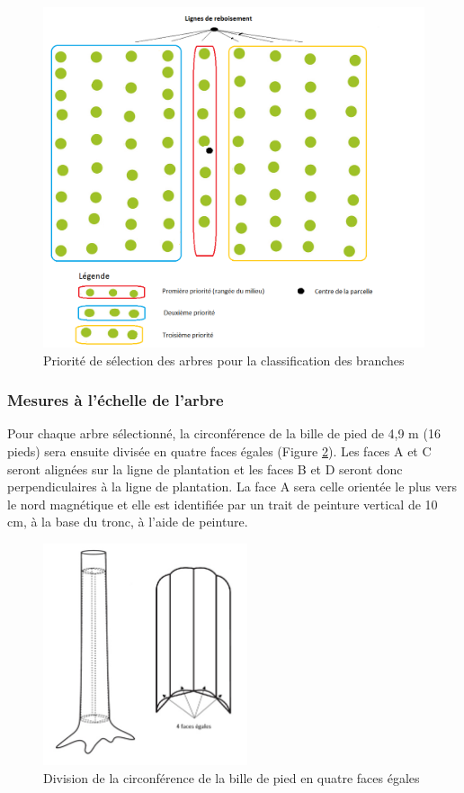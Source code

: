 \documentclass[letterpaper, 12pt]{article}
\begin{document}
\begin{onehalfspace}
\begin{figure} [H]
	\centering
	\includegraphics[width=14cm]{Figure1}
	\caption{Priorité de sélection des arbres pour la classification des branches}
	\label{select}
\end{figure}

\vspace{12pt}

\subsubsection{Mesures à l'échelle de l'arbre}

Pour chaque arbre sélectionné, la circonférence de la bille de pied de 4,9 m (16 pieds) sera ensuite divisée en quatre faces égales (Figure \ref{face}). Les faces A et C seront alignées sur la ligne de plantation et les faces B et D seront donc perpendiculaires à la ligne de plantation. La face A sera celle orientée le plus vers le nord magnétique et elle est identifiée par un trait de peinture vertical de 10 cm, à la base du tronc, à l’aide de peinture.

\vspace{12pt}

\begin{figure}[H]
	\centering
	\includegraphics[width=6cm]{Figure2}
	\caption{Division de la circonférence de la bille de pied en quatre faces égales}
	\label{face}
\end{figure}


\end{onehalfspace}
\end{document}
